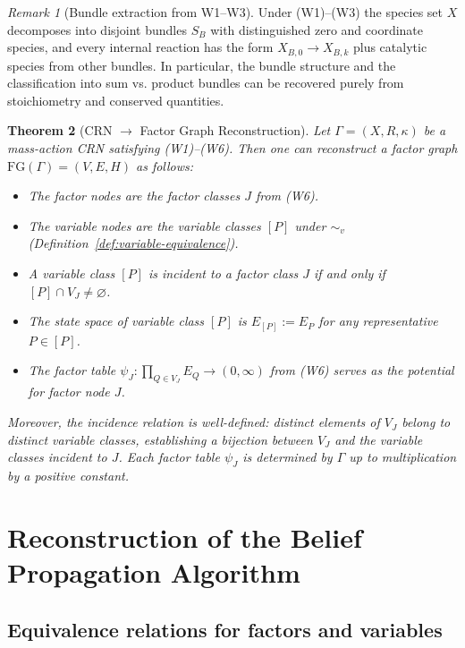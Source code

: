 \documentclass{article}
\theoremstyle{plain}
\newtheorem{theorem}{Theorem}[section]
\theoremstyle{definition}
\theoremstyle{remark}
\newtheorem{remark}[theorem]{Remark}
\newcommand{\<}{\langle}
\renewcommand{\>}{\rangle}
\begin{document}
\begin{remark}[Bundle extraction from W1--W3]\label{prop:bundles}
Under \textup{(W1)--(W3)} the species set $X$ decomposes into disjoint bundles
$S_B$ with distinguished zero and coordinate species, and every internal
reaction has the form $X_{B,0}\to X_{B,k}$ plus catalytic species from other
bundles. In particular, the bundle structure and the classification into sum vs.
product bundles can be recovered purely from stoichiometry and conserved
quantities.
\end{remark}

\begin{theorem}[CRN $\to$ Factor Graph Reconstruction]\label{thm:recon}
Let $\Gamma = (X, R, \kappa)$ be a mass-action CRN satisfying \textup{(W1)--(W6)}.
Then one can reconstruct a factor graph $\mathrm{FG}(\Gamma) = (V,E, H)$ as follows:
\begin{itemize}
    \item The factor nodes are the factor classes $J$ from \textup{(W6)}.
    \item The variable nodes are the variable classes $[P]$ under $\sim_v$ 
          \textup{(Definition~\ref{def:variable-equivalence})}.
    \item A variable class $[P]$ is incident to a factor class $J$ if and only 
          if $[P] \cap V_J \neq \varnothing$.
    \item The state space of variable class $[P]$ is $E_{[P]} := E_P$ for any 
          representative $P \in [P]$.
    \item The factor table $\psi_J : \prod_{Q \in V_J} E_Q \to (0,\infty)$ from 
          \textup{(W6)} serves as the potential for factor node $J$.
\end{itemize}
Moreover, the incidence relation is well-defined: distinct elements of $V_J$ 
belong to distinct variable classes, establishing a bijection between $V_J$ and 
the variable classes incident to $J$. Each factor table $\psi_J$ is determined 
by $\Gamma$ up to multiplication by a positive constant.
\end{theorem}

\section{Reconstruction of the Belief Propagation Algorithm}
\subsection{Equivalence relations for factors and variables}
\end{document}
